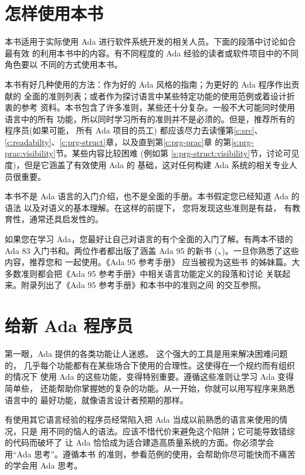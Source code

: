 \section{怎样使用本书}
本书适用于实际使用 Ada 进行软件系统开发的相关人员。下面的段落中讨论如合最有效
的利用本书中的内容。有不同程度的 Ada 经验的读者或软件项目中的不同角色要以
不同的方式使用本书。

本书有好几种使用的方法：作为好的 Ada 风格的指南；为更好的 Ada 程序作出贡献的
全面的准则列表；或者作为探讨语言中某些特定功能的使用范例或着设计折衷的参考
资料。本书包含了许多准则，某些还十分复杂。一般不大可能同时使用语言中的所有
功能，所以同时学习所有的准则并不是必须的。但是，推荐所有的程序员(如果可能，
所有 Ada 项目的员工) 都应该尽力去读懂第\ref{c:src}、
\ref{c:readabilty}、\ref{c:prg-struct}章，以及直到第\ref{c:prg-prac}章
的第\ref{s:prg-prac:visibility}节。某些内容比较困难 (例如第
\ref{s:prg-struct:visibility}节，讨论可见度)，但是它涵盖了有效使用 Ada 的
基础，这对任何构建 Ada 系统的相关专业人员很重要。

本书不是 Ada 语言的入门介绍，也不是全面的手册。本书假定您已经知道 Ada 的语法
以及对语义的基本理解。在这样的前提下， 您将发现这些准则是有益，
有教育性，通常还具启发性的。

如果您在学习 Ada，您最好让自己对语言的有个全面的入门了解。有两本不错的 Ada 83
入门书\cite{barnes89}和\cite{cohen86}。两位作者都出版了涵盖 Ada 95 的新书
(\cite{barnes96}、\cite{cohen96})。一旦你熟悉了这些内容，推荐您和
\cite{rational95}一起使用。《Ada 95 参考手册》\cite{arm95} 应当被视为这些书
的姊妹篇。大多数准则都会把《Ada 95 参考手册》中相关语言功能定义的段落和讨论
关联起来。附录\cite{a:cross-ref}列出了《Ada 95 参考手册》和本书中的准则之间
的交互参照。

\section{给新 Ada 程序员}
第一眼，Ada 提供的各类功能让人迷惑。 这个强大的工具是用来解决困难问题的，
几乎每个功能都有在某些场合下使用的合理性。这使得在一个规约而有组织的情况下
使用 Ada 的这些功能，变得特别重要。遵循这些准则让学习 Ada 变得简单些，
还能帮助你掌握她的复杂的功能。从一开始，你就可以用写程序来熟悉语言中的
最好功能，就像语言设计者预期的那样。

有使用其它语言经验的程序员经常陷入把 Ada 当成以前熟悉的语言来使用的情况，只是
用不同的恼人的语法。应该不惜代价来避免这个陷阱；它可能导致错综的代码而破坏了
让 Ada 恰恰成为适合建造高质量系统的方面。你必须学会用``Ada 思考''。遵循本书
的准则，参看范例的使用，会帮助你尽可能快而不痛苦的学会用 Ada 思考。 

